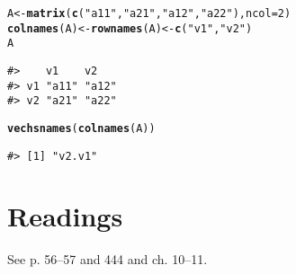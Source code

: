 \documentclass{article}\usepackage[]{graphicx}\usepackage[]{color}
\makeatletter
\newcommand{\hlnum}[1]{\textcolor[rgb]{0.686,0.059,0.569}{#1}}%
\newcommand{\hlstr}[1]{\textcolor[rgb]{0.192,0.494,0.8}{#1}}%
\newcommand{\hlstd}[1]{\textcolor[rgb]{0.345,0.345,0.345}{#1}}%
\newcommand{\hlkwb}[1]{\textcolor[rgb]{0.69,0.353,0.396}{#1}}%
\newcommand{\hlkwc}[1]{\textcolor[rgb]{0.333,0.667,0.333}{#1}}%
\newcommand{\hlkwd}[1]{\textcolor[rgb]{0.737,0.353,0.396}{\textbf{#1}}}%
\newenvironment{kframe}{%
 \def\at@end@of@kframe{}%
 \ifinner\ifhmode%
  \def\at@end@of@kframe{\end{minipage}}%
  \begin{minipage}{\columnwidth}%
 \fi\fi%
 \def\FrameCommand##1{\hskip\@totalleftmargin \hskip-\fboxsep
 \colorbox{shadecolor}{##1}\hskip-\fboxsep
     \hskip-\linewidth \hskip-\@totalleftmargin \hskip\columnwidth}%
 \MakeFramed {\advance\hsize-\width
   \@totalleftmargin\z@ \linewidth\hsize
   \@setminipage}}%
 {\par\unskip\endMakeFramed%
 \at@end@of@kframe}
\newenvironment{knitrout}{}{} %
\makeatother
\begin{document}
\begin{knitrout}
\color{fgcolor}\begin{kframe}
\begin{alltt}
\hlstd{A} \hlkwb{<-} \hlkwd{matrix}\hlstd{(}\hlkwd{c}\hlstd{(}\hlstr{"a11"}\hlstd{,} \hlstr{"a21"}\hlstd{,} \hlstr{"a12"}\hlstd{,} \hlstr{"a22"}\hlstd{),} \hlkwc{ncol} \hlstd{=} \hlnum{2}\hlstd{)}
\hlkwd{colnames}\hlstd{(A)} \hlkwb{<-} \hlkwd{rownames}\hlstd{(A)} \hlkwb{<-} \hlkwd{c}\hlstd{(}\hlstr{"v1"}\hlstd{,} \hlstr{"v2"}\hlstd{)}
\hlstd{A}
\end{alltt}
\begin{verbatim}
#>    v1    v2   
#> v1 "a11" "a12"
#> v2 "a21" "a22"
\end{verbatim}
\end{kframe}
\end{knitrout}

\begin{knitrout}
\color{fgcolor}\begin{kframe}
\begin{alltt}
\hlkwd{vechsnames}\hlstd{(}\hlkwd{colnames}\hlstd{(A))}
\end{alltt}
\begin{verbatim}
#> [1] "v2.v1"
\end{verbatim}
\end{kframe}
\end{knitrout}



\newpage

\section*{Readings}

See \Textcite{Magnus-2019} p. 56--57 and 444
and
\Textcite{Abadir-2005} ch. 10--11.

\nocite{R-2021}

\printbibliography
\end{document}
